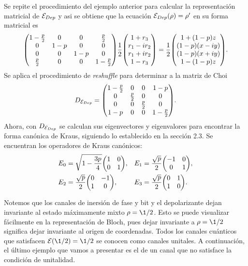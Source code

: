 Se repite el procedimiento del ejemplo anterior para calcular 
la representación matricial de $\mathcal{E}_{Dep}$ y asi se obtiene
que la ecuación $\mathcal{E}_{Dep}(\rho)=\rho'$ en su forma matricial es
\begin{align}
\mqty(
1-\frac{p}{2} & 0 & 0 & \frac{p}{2} \\
0 & 1-p & 0 & 0 \\
0 & 0 & 1-p & 0 \\
\frac{p}{2} & 0 & 0 & 1-\frac{p}{2}
)
\frac{1}{2}
\mqty(
1+r_3\\r_1-ir_2\\r_1+ir_2\\1-r_3
)
=
\frac{1}{2}
\mqty(
1+\qty(1-p)z\\
\qty(1-p)\qty(x-i y)\\
\qty(1-p)\qty(x+i y)\\
1-\qty(1-p)z
).
\end{align}
Se aplica el procedimiento de \textit{reshuffle}
para determinar a la matriz de Choi
\begin{align}
D_{\E_{Dep}}=
\mqty(
 1-\frac{p}{2} & 0 & 0 & 1-p \\
 0 & \frac{p}{2} & 0 & 0 \\
 0 & 0 & \frac{p}{2} & 0 \\
 1-p & 0 & 0 & 1-\frac{p}{2} 
).
\label{•}
\end{align}
Ahora, con $D_{\mathcal{E}_{Dep}}$ se calculan sus 
eigenvectores y eigenvalores para encontrar la forma 
canónica de Kraus, siguiendo lo establecido en la
sección 2.3. Se encuentran los operadores de Kraus
canónicos:
\begin{align}
E_0&=
\sqrt{1-\frac{3p}{4}}
\mqty(
1 & 0\\
0 & 1
),&
E_1&=
\frac{\sqrt{p}}{2}
\mqty(
-1 & 0\\
0 & 1
),\\
E_2&=
\frac{\sqrt{p}}{2}
\mqty(
0 & -1\\
1 & 0
), &
E_3&=
\frac{\sqrt{p}}{2}
\mqty(
0 & 1\\
1 & 0
).
\end{align}

Notemos que los canales de inersión de fase y bit y el
depolarizante dejan invariante al estado máximamente mixto
$\rho=\1/2$. Esto se puede visualizar fácilmente en la representación
de Bloch, pues dejar invariante a $\rho=\1/2$ significa dejar 
invariante al origen de coordenadas. Todos los canales 
cuánticos que satisfacen $\E(\1/2)=\1/2$
se conocen como canales unitales. 
A continuación, el último ejemplo que vamos a presentar
es el de un canal que no satisface la condición de unitalidad.

